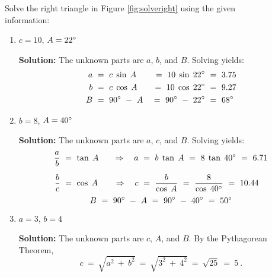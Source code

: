 \begin{exmp}
\piccaption[]{\label{fig:solveright}}
\noindent Solve the right triangle in Figure \ref{fig:solveright} using the given\\information:
 \begin{enumerate}[\bfseries (a)]
  \item $c = 10$, $A = 22^\circ$
   \par\noindent\textbf{Solution:} The unknown parts are $a$, $b$, and $B$. Solving yields:
   \begin{alignat*}{7}
    a ~ &= ~ c\;\sin\;A ~ &= ~ 10\;\sin\;22^\circ ~ &= ~ 3.75\\
    b ~ &= ~ c\;\cos\;A ~ &= ~ 10\;\cos\;22^\circ ~ &= ~ 9.27\\
    B ~ &= ~ 90^\circ ~-~ A ~ &= ~ 90^\circ ~-~ 22^\circ ~ &= ~ 68^\circ
   \end{alignat*}
  \item $b = 8$, $A = 40^\circ$
   \par\noindent\textbf{Solution:} The unknown parts are $a$, $c$, and $B$. Solving yields:
   \begin{alignat*}{3}
    \frac{a}{b} ~ &= ~ \tan\;A \quad &\Rightarrow \quad a ~ &= ~ b\;\tan\;A ~ = ~
	 8\;\tan\;40^\circ ~ = ~ 6.71\\[2mm]
    \frac{b}{c} ~ &= ~ \cos\;A \quad &\Rightarrow \quad c ~ &= ~ \frac{b}{\cos\;A} ~ = ~
	 \frac{8}{\cos\;40^\circ} ~ = ~ 10.44
   \end{alignat*}
   \begin{displaymath}
    B ~ = ~ 90^\circ ~-~ A ~ = ~ 90^\circ ~-~ 40^\circ ~ = ~ 50^\circ
   \end{displaymath}
  \item $a = 3$, $b = 4$
   \par\noindent\textbf{Solution:} The unknown parts are $c$, $A$, and $B$. By the Pythagorean
   Theorem,
   \begin{displaymath}
    c ~=~ \sqrt{a^2 ~+~ b^2} ~=~ \sqrt{3^2 ~+~ 4^2} ~=~ \sqrt{25} ~=~ 5 ~.

\end{displaymath}
\end{enumerate}
\end{exmp}

